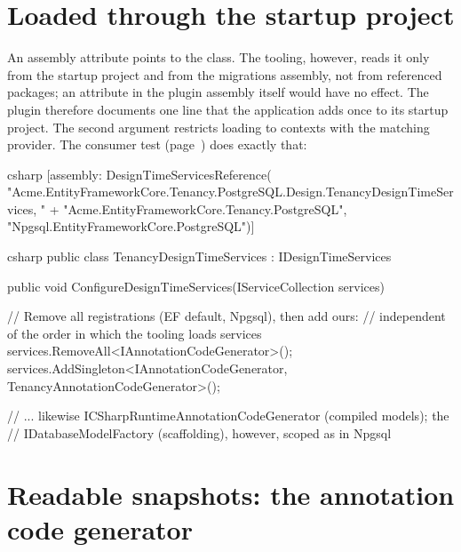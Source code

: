 \section{Loaded through the startup project}

An assembly attribute points to the class. The tooling, however, reads it only from the
startup project and from the migrations assembly, not from referenced packages; an attribute
in the plugin assembly itself would have no effect. The plugin therefore documents one line
that the application adds once to its startup project. The second argument restricts loading
to contexts with the matching provider. The consumer test
(page~\pageref{sec:consumer-test}) does exactly that:

\begin{sourcecode}{csharp}
[assembly: DesignTimeServicesReference(
    "Acme.EntityFrameworkCore.Tenancy.PostgreSQL.Design.TenancyDesignTimeServices, "
        + "Acme.EntityFrameworkCore.Tenancy.PostgreSQL",
    "Npgsql.EntityFrameworkCore.PostgreSQL")]
\end{sourcecode}

\begin{sourcecode}{csharp}
public class TenancyDesignTimeServices : IDesignTimeServices
{
    public void ConfigureDesignTimeServices(IServiceCollection services)
    {
        // Remove all registrations (EF default, Npgsql), then add ours:
        // independent of the order in which the tooling loads services
        services.RemoveAll<IAnnotationCodeGenerator>();
        services.AddSingleton<IAnnotationCodeGenerator, TenancyAnnotationCodeGenerator>();

        // ... likewise ICSharpRuntimeAnnotationCodeGenerator (compiled models); the
        // IDatabaseModelFactory (scaffolding), however, scoped as in Npgsql
    }
}
\end{sourcecode}

\section{Readable snapshots: the annotation code generator}

